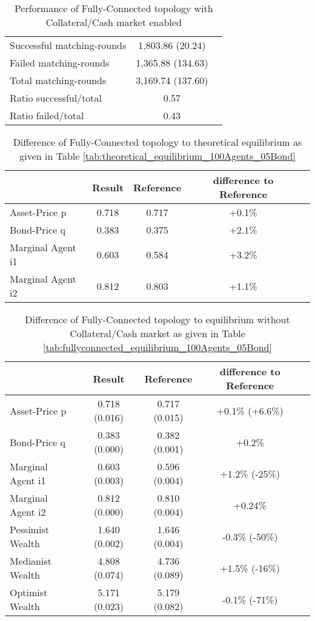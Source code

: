 \documentclass[Bachelorarbeit.tex]{subfiles}
\begin{document}
\begin{table}[H]
	\caption{Performance of Fully-Connected topology with Collateral/Cash market enabled}
	\centering
	\begin{tabular} { l c r }
		\hline
		Successful matching-rounds & 1,803.86 (20.24) \\
		Failed matching-rounds & 1,365.88 (134.63) \\
		Total matching-rounds & 3,169.74 (137.60) \\
		\hline
		Ratio successful/total & 0.57 \\
		Ratio failed/total & 0.43 \\
		\hline
	\end{tabular}
\end{table}

\begin{table}[H]
	\caption{Difference of Fully-Connected topology to theoretical equilibrium as given in Table \ref{tab:theoretical_equilibrium_100Agents_05Bond}}
	\centering
	\begin{tabular} { l c c c r }
		& Result & Reference & difference to Reference \\
		\hline
		Asset-Price p & 0.718 & 0.717 & +0.1\% \\
		Bond-Price q & 0.383 & 0.375 & +2.1\% \\
		Marginal Agent i1 & 0.603 & 0.584 & +3.2\% \\
		Marginal Agent i2 & 0.812 & 0.803 & +1.1\% \\
		\hline
	\end{tabular}
\end{table} 

\begin{table}[H]
	\caption{Difference of Fully-Connected topology to equilibrium without Collateral/Cash market as given in Table \ref{tab:fullyconnected_equilibrium_100Agents_05Bond}}
	\centering
	\begin{tabular} { l c c c r }
		& Result & Reference & difference to Reference \\
		\hline
		Asset-Price p & 0.718 (0.016) & 0.717 (0.015) & +0.1\% (+6.6\%) \\
		Bond-Price q & 0.383 (0.000) & 0.382 (0.001) & +0.2\%  \\
		Marginal Agent i1 & 0.603 (0.003) & 0.596 (0.004) & +1.2\% (-25\%) \\
		Marginal Agent i2 & 0.812 (0.000) & 0.810 (0.004) & +0.24\% \\
		\hline
		Pessimist Wealth & 1.640 (0.002) & 1.646 (0.004) & -0.3\% (-50\%) \\
		Medianist Wealth & 4.808 (0.074) & 4.736 (0.089) & +1.5\% (-16\%) \\
		Optimist Wealth & 5.171 (0.023) & 5.179 (0.082) & -0.1\% (-71\%) \\
		\hline
	\end{tabular}
\end{table} 
\end{document}
